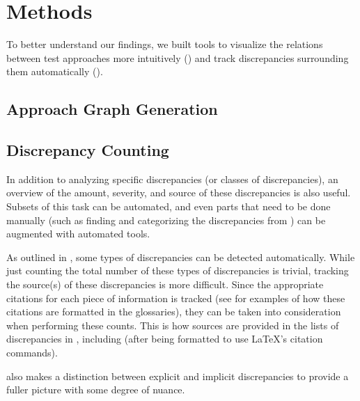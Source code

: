 \section{Methods}
\label{methods}

To better understand our findings, we built tools to visualize the
relations between test approaches more intuitively () and track
discrepancies surrounding them automatically ().

\subsection{Approach Graph Generation}
\label{graph-gen}

\graphGenDesc{}

\subsection{Discrepancy Counting}
\label{discrep-count}

In addition to analyzing specific discrepancies (or classes of discrepancies),
an overview of the amount, severity, and source of these discrepancies is also
useful. Subsets of this task can be automated, and even parts that need to be
done manually (such as finding and categorizing the discrepancies from
) can be augmented with automated tools.

As outlined in , some types of discrepancies can be detected
automatically. While just counting the total number of these types of
discrepancies is trivial, tracking the source(s) of these discrepancies is more
difficult. Since the appropriate citations for each piece of information is
tracked (see  for examples of
how these citations are formatted
in the glossaries), they can be taken into consideration when performing
these counts. This is how sources are provided in the lists of discrepancies in
, including  (after being formatted
to use \LaTeX{}'s citation commands).

 also makes a distinction between explicit and implicit%
discrepancies to provide a fuller picture with some degree of nuance.